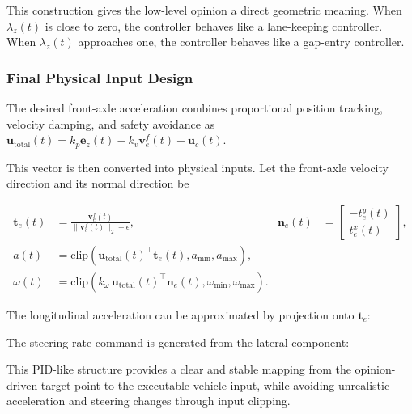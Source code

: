 This construction gives the low-level opinion a direct geometric meaning. When \(\lambda_z(t)\) is close to zero, the controller behaves like a lane-keeping controller. When \(\lambda_z(t)\) approaches one, the controller behaves like a gap-entry controller.



\subsubsection{Final Physical Input Design}





The desired front-axle acceleration combines proportional position tracking, velocity damping, and safety avoidance as \(\mathbf{u}_{\mathrm{total}}(t)=k_p\mathbf{e}_z(t)-k_v\mathbf{v}_e^f(t)+\mathbf{u}_c(t)\).





This vector is then converted into physical inputs. Let the front-axle velocity direction and its normal direction be



{\small
\begin{equation}
\begin{aligned}
\mathbf{t}_e(t)&=\frac{\mathbf{v}_e^f(t)}{\lVert\mathbf{v}_e^f(t)\rVert_2+\epsilon},&
\mathbf{n}_e(t)&=\begin{bmatrix}-t_e^y(t)\\t_e^x(t)\end{bmatrix},\\
a(t)&=\mathrm{clip}\left(\mathbf{u}_{\mathrm{total}}(t)^\top\mathbf{t}_e(t),a_{\min},a_{\max}\right),\\
\omega(t)&=\mathrm{clip}\left(k_{\omega}\,\mathbf{u}_{\mathrm{total}}(t)^\top\mathbf{n}_e(t),\omega_{\min},\omega_{\max}\right).
\end{aligned}
\end{equation}
}





The longitudinal acceleration can be approximated by projection onto \(\mathbf{t}_e\):





The steering-rate command is generated from the lateral component:





This PID-like structure provides a clear and stable mapping from the opinion-driven target point to the executable vehicle input, while avoiding unrealistic acceleration and steering changes through input clipping.



